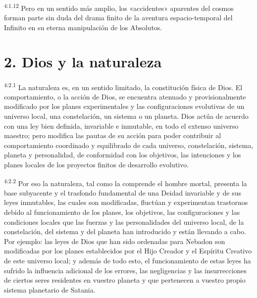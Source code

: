 \par
\textsuperscript{4:1.12} Pero en un sentido más amplio, los «accidentes» aparentes del cosmos forman parte sin duda del drama finito de la aventura espacio-temporal del Infinito en su eterna manipulación de los Absolutos.

\section*{2. Dios y la naturaleza}
\par
\textsuperscript{4:2.1} La naturaleza es, en un sentido limitado, la constitución física de Dios. El comportamiento, o la acción de Dios, se encuentra atenuado y provisionalmente modificado por los planes experimentales y las configuraciones evolutivas de un universo local, una constelación, un sistema o un planeta. Dios actúa de acuerdo con una ley bien definida, invariable e inmutable, en todo el extenso universo maestro; pero modifica las pautas de su acción para poder contribuir al comportamiento coordinado y equilibrado de cada universo, constelación, sistema, planeta y personalidad, de conformidad con los objetivos, las intenciones y los planes locales de los proyectos finitos de desarrollo evolutivo.

\par
\textsuperscript{4:2.2} Por eso la naturaleza, tal como la comprende el hombre mortal, presenta la base subyacente y el trasfondo fundamental de una Deidad invariable y de sus leyes inmutables, las cuales son modificadas, fluctúan y experimentan trastornos debido al funcionamiento de los planes, los objetivos, las configuraciones y las condiciones locales que las fuerzas y las personalidades del universo local, de la constelación, del sistema y del planeta han introducido y están llevando a cabo. Por ejemplo: las leyes de Dios que han sido ordenadas para Nebadon son modificadas por los planes establecidos por el Hijo Creador y el Espíritu Creativo de este universo local; y además de todo esto, el funcionamiento de estas leyes ha sufrido la influencia adicional de los errores, las negligencias y las insurrecciones de ciertos seres residentes en vuestro planeta y que pertenecen a vuestro propio sistema planetario de Satania.

